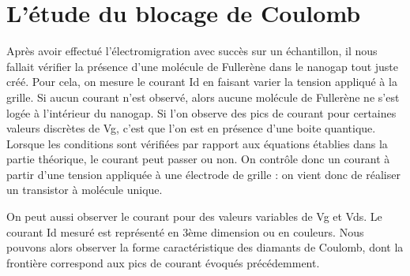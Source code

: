 \section{L'étude du blocage de Coulomb}
Après avoir effectué l'électromigration avec succès sur un échantillon, il nous fallait vérifier la présence d'une molécule de Fullerène dans le nanogap tout juste créé.  Pour cela, on mesure le courant Id en faisant varier la tension appliqué à la grille. Si aucun courant n'est observé, alors aucune molécule de Fullerène ne s'est logée à l'intérieur du nanogap. Si l'on observe des pics de courant pour certaines valeurs discrètes de Vg, c'est que l'on est en présence d'une boite quantique. Lorsque les conditions sont vérifiées par rapport aux équations établies dans la partie théorique, le courant peut passer ou non. On contrôle donc un courant  à partir d'une tension appliquée à une électrode de grille : on vient donc de réaliser un transistor à molécule unique.

On peut aussi observer le courant pour des valeurs variables de Vg et Vds. Le courant Id mesuré est représenté en 3ème dimension ou en couleurs. Nous pouvons alors observer la forme caractéristique des diamants de Coulomb, dont la frontière correspond aux pics de courant évoqués précédemment.
